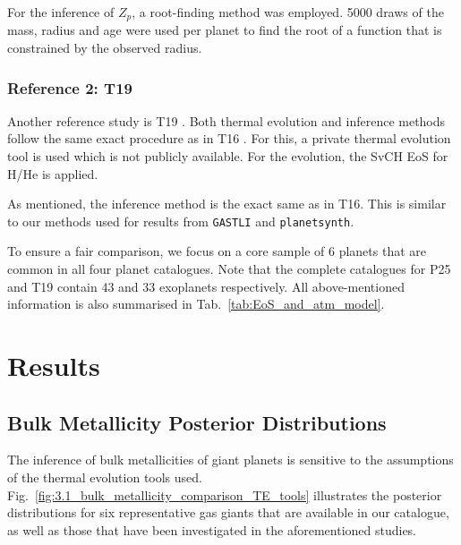 \documentclass{aa}
\begin{document}
For the inference of $Z_p$, a root-finding method was employed. 5000 draws of the mass, radius and age were used per planet to find the root of a function that is constrained by the observed radius.


\subsubsection{Reference 2: T19}
Another reference study is T19 \citep{teske_metal-rich_2019}. Both thermal evolution and inference methods follow the same exact procedure as in T16 \citep{thorngren_mass-metallicity_2016}. For this, a private thermal evolution tool is used which is not publicly available. For the evolution, the SvCH \citep{saumon_equation_1995} EoS for H/He is applied. 

As mentioned, the inference method is the exact same as in T16. This is similar to our methods used for results from \texttt{GASTLI} and \texttt{planetsynth}.
\medskip

To ensure a fair comparison, we focus on a core sample of 6 planets that are common in all four planet catalogues. Note that the complete catalogues for P25 and T19 contain 43 and 33 exoplanets respectively. All above-mentioned information is also summarised in Tab.~\ref{tab:EoS_and_atm_model}.




\section{Results}

\subsection{Bulk Metallicity Posterior Distributions}
The inference of bulk metallicities of giant planets is sensitive to the assumptions of the thermal evolution tools used. Fig.~\ref{fig:3.1_bulk_metallicity_comparison_TE_tools} illustrates the posterior distributions for six representative gas giants that are available in our catalogue, as well as those that have been investigated in the aforementioned studies.
\end{document}
